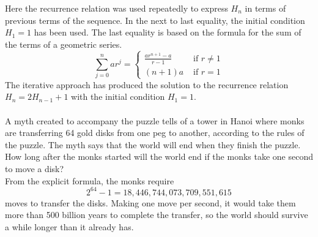 \documentclass[12pt]{article}
\begin{document}
\begin{example}
Here the recurrence relation was used repeatedly to express $H_n$ in terms of previous terms of the sequence. In the next to last equality, the initial condition $H_1 = 1$ has been used. The last equality is based on the formula for the sum of the terms of a geometric series. $$ \sum_{j = 0}^n ar^j = \begin{cases} \frac{ar^{n + 1} - a}{r - 1} &\text{ if } r \neq 1 \\ (n + 1)a &\text{ if } r = 1 \end{cases} $$ The iterative approach has produced the solution to the recurrence relation $H_n = 2H_{n - 1} + 1$ with the initial condition $H_1 = 1$. \\~\\ A myth created to accompany the puzzle tells of a tower in Hanoi where monks are transferring 64 gold disks from one peg to another, according to the rules of the puzzle. The myth says that the world will end when they finish the puzzle. How long after the monks started will the world end if the monks take one second to move a disk? \\ From the explicit formula, the monks require $$ 2^{64} - 1 = 18,446,744,073,709,551,615 $$ moves to transfer the disks. Making one move per second, it would take them more than 500 billion years to complete the transfer, so the world should survive a while longer than it already has. \end{example} 
\end{document}
